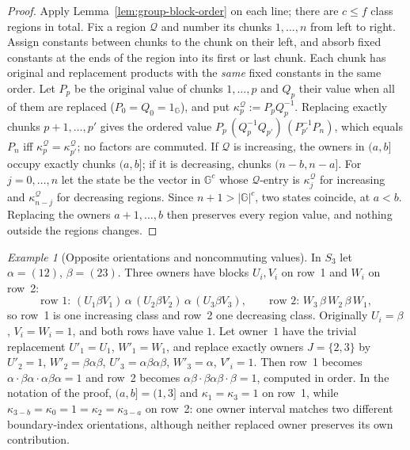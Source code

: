 \documentclass[11pt]{article}
\numberwithin{equation}{section}
\theoremstyle{plain}
\theoremstyle{definition}
\theoremstyle{remark}
\newtheorem{example}[theorem]{Example}
\begin{document}
\begin{proof}
Apply Lemma~\ref{lem:group-block-order} on each line; there are $c\le f$ class
regions in total.  Fix a region $\mathcal Q$ and number its chunks $1,\ldots,n$ from
left to right.  Assign constants between chunks to the chunk on their left,
and absorb fixed constants at the ends of the region into its first or last
chunk.  Each chunk has original and replacement products with the \emph{same}
fixed constants in the same order.  Let $P_p$ be the original value of chunks $1,\ldots,p$ and $Q_p$ their value
when all of them are replaced ($P_0=Q_0=1_{\mathbb G}$), and put
$\kappa^{\mathcal Q}_p:=P_pQ_p^{-1}$.  Replacing exactly chunks $p+1,\ldots,p'$ gives
the ordered value $P_p\,(Q_p^{-1}Q_{p'})\,(P_{p'}^{-1}P_n)$, which equals $P_n$
iff $\kappa^{\mathcal Q}_p=\kappa^{\mathcal Q}_{p'}$; no factors are commuted.  If
$\mathcal Q$ is increasing, the owners in $(a,b]$ occupy exactly chunks $(a,b]$; if it
is decreasing, chunks $(n-b,n-a]$.  For $j=0,\ldots,n$ let the state be the vector in
${\mathbb G}^c$ whose $\mathcal Q$-entry is $\kappa^{\mathcal Q}_j$ for increasing and
$\kappa^{\mathcal Q}_{n-j}$ for decreasing regions.  Since $n+1>|{\mathbb G}|^c$, two states
coincide, at $a<b$.  Replacing the owners $a+1,\ldots,b$ then preserves every region
value, and nothing outside the regions changes.
\end{proof}

\begin{example}[Opposite orientations and noncommuting values]
\label{ex:nonabelian-reverse-owner}
In $S_3$ let $\alpha=(12)$, $\beta=(23)$.  Three owners have blocks $U_i,V_i$ on
row~1 and $W_i$ on row~2:
\[
 \text{row 1: }(U_1\beta V_1)\,\alpha\,(U_2\beta V_2)\,\alpha\,(U_3\beta V_3),\qquad
 \text{row 2: }W_3\,\beta\,W_2\,\beta\,W_1,
\]
so row~1 is one increasing class and row~2 one decreasing class.  Originally
$U_i=\beta$, $V_i=W_i=1$, and both rows have value $1$.  Let owner~$1$ have the
trivial replacement $U'_1=U_1$, $W'_1=W_1$, and replace exactly owners
$J=\{2,3\}$ by $U'_2=1$, $W'_2=\beta\alpha\beta$, $U'_3=\alpha\beta\alpha\beta$,
$W'_3=\alpha$, $V'_i=1$.  Then row~1 becomes
$\alpha\cdot\beta\alpha\cdot\alpha\beta\alpha=1$ and row~2 becomes
$\alpha\beta\cdot\beta\alpha\beta\cdot\beta=1$, computed in order.  In the notation
of the proof, $(a,b]=(1,3]$ and $\kappa_1=\kappa_3=1$ on row~1, while
$\kappa_{3-b}=\kappa_0=1=\kappa_2=\kappa_{3-a}$ on row~2: one owner interval matches
two different boundary-index orientations, although neither replaced owner
preserves its own contribution.
\end{example}
\end{document}
